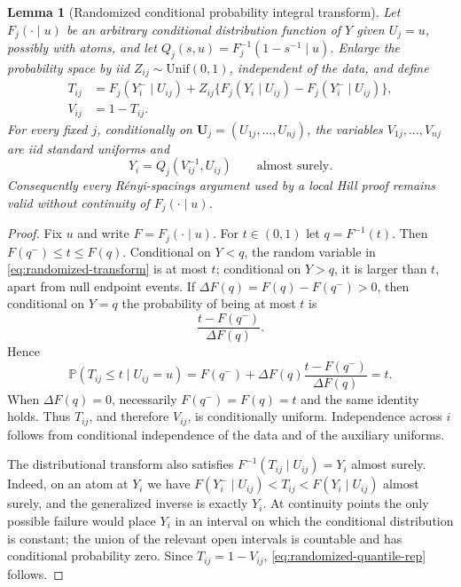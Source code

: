 \documentclass[11pt]{article}
\newtheorem{lemma}[theorem]{Lemma}
\theoremstyle{definition}\newtheorem{definition}[theorem]{Definition}
\newcommand{\Pp}{\mathbb P}
\begin{document}
\begin{lemma}[Randomized conditional probability integral transform]
\label{lem:randomized-pit}
Let $F_j(\cdot\mid u)$ be an arbitrary conditional distribution function of
$Y$ given $U_j=u$, possibly with atoms, and let
$Q_j(s,u)=F_j^{-1}(1-s^{-1}\mid u)$.  Enlarge the probability space by iid
$Z_{ij}\sim\mathrm{Unif}(0,1)$, independent of the data, and define
\begin{align}
 T_{ij}
 &=F_j(Y_i^-\mid U_{ij})
   +Z_{ij}\{F_j(Y_i\mid U_{ij})-F_j(Y_i^-\mid U_{ij})\},
 \label{eq:randomized-transform}\\
 V_{ij}&=1-T_{ij}.
\end{align}
For every fixed $j$, conditionally on
$\bm U_j=(U_{1j},\ldots,U_{nj})$, the variables $V_{1j},\ldots,V_{nj}$ are
iid standard uniforms and
\begin{equation}
 Y_i=Q_j(V_{ij}^{-1},U_{ij})
 \qquad\text{almost surely.}
 \label{eq:randomized-quantile-rep}
\end{equation}
Consequently every R\'enyi-spacings argument used by a local Hill proof
remains valid without continuity of $F_j(\cdot\mid u)$.
\end{lemma}

\begin{proof}
Fix $u$ and write $F=F_j(\cdot\mid u)$.  For $t\in(0,1)$ let
$q=F^{-1}(t)$.  Then $F(q^-)\le t\le F(q)$.  Conditional on $Y<q$, the
random variable in \eqref{eq:randomized-transform} is at most $t$; conditional
on $Y>q$, it is larger than $t$, apart from null endpoint events.  If
$\Delta F(q)=F(q)-F(q^-)>0$, then conditional on $Y=q$ the probability of
being at most $t$ is
\[
 \frac{t-F(q^-)}{\Delta F(q)}.
\]
Hence
\[
 \Pp(T_{ij}\le t\mid U_{ij}=u)
 =F(q^-)+\Delta F(q)
   \frac{t-F(q^-)}{\Delta F(q)}=t.
\]
When $\Delta F(q)=0$, necessarily $F(q^-)=F(q)=t$ and the same identity
holds.  Thus $T_{ij}$, and therefore $V_{ij}$, is conditionally uniform.
Independence across $i$ follows from conditional independence of the data and
of the auxiliary uniforms.

The distributional transform also satisfies
$F^{-1}(T_{ij}\mid U_{ij})=Y_i$ almost surely.  Indeed, on an atom at $Y_i$
we have
$F(Y_i^-\mid U_{ij})<T_{ij}<F(Y_i\mid U_{ij})$ almost surely, and the
generalized inverse is exactly $Y_i$.  At continuity points the only possible
failure would place $Y_i$ in an interval on which the conditional distribution
is constant; the union of the relevant open intervals is countable and has
conditional probability zero.  Since $T_{ij}=1-V_{ij}$,
\eqref{eq:randomized-quantile-rep} follows.
\end{proof}
\end{document}
